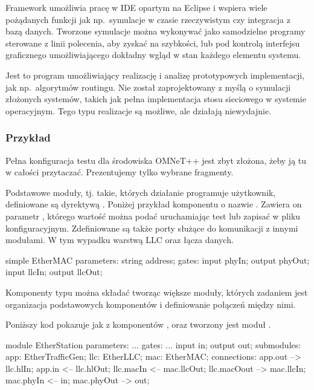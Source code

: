 \documentclass[00-praca-magisterska.tex]{subfiles}
\begin{document}
Framework umożliwia pracę w IDE opartym na Eclipse i wspiera wiele pożądanych
funkcji jak np.~symulacje w czasie rzeczywistym czy integracja z bazą danych.
Tworzone symulacje można wykonywać jako samodzielne programy sterowane z linii
polecenia, aby zyskać na szybkości, lub pod kontrolą interfejsu graficznego
umożliwiającego dokładny wgląd w stan każdego elementu systemu.

Jest to program umożliwiający realizację i analizę prototypowych implementacji,
jak np.~algorytmów routingu. Nie został zaprojektowany z myślą o symulacji
złożonych systemów, takich jak pełna implementacja stosu sieciowego w systemie
operacyjnym. Tego typu realizacje są możliwe, ale działają niewydajnie.

\subsubsection{Przykład}

Pełna konfiguracja testu dla środowiska OMNeT++ jest zbyt złożona, żeby ją tu w
całości przytaczać. Prezentujemy tylko wybrane fragmenty.

Podstawowe moduły, tj. takie, których działanie programuje użytkownik,
definiowane są dyrektywą . Poniżej przykład komponentu o nazwie
. Zawiera on parametr , którego wartość można
podać uruchamiając test lub zapisać w pliku konfiguracyjnym. Zdefiniowane są
także porty służące do komunikacji z innymi modułami. W tym wypadku warstwą LLC
oraz łącza danych.

\begin{textcode}
  simple EtherMAC {
      parameters:
          string address;
      gates:
          input phyIn;
          output phyOut;
          input llcIn;
          output llcOut;
  }
\end{textcode}

Komponenty typu  można składać tworząc większe moduły, których
zadaniem jest organizacja podstawowych komponentów i definiowanie połączeń
między nimi.

Poniższy kod pokazuje jak z komponentów , 
oraz  tworzony jest moduł .

\begin{textcode}
  module EtherStation {
      parameters: ...
      gates: ...
          input in;
          output out;  
      submodules:
          app: EtherTrafficGen;
          llc: EtherLLC;
          mac: EtherMAC;
      connections:
          app.out --> llc.hlIn;
          app.in <-- llc.hlOut;
          llc.macIn <-- mac.llcOut;
          llc.macOout --> mac.llcIn;
          mac.phyIn <-- in;
          mac.phyOut --> out;
  }
\end{textcode}
\end{document}
